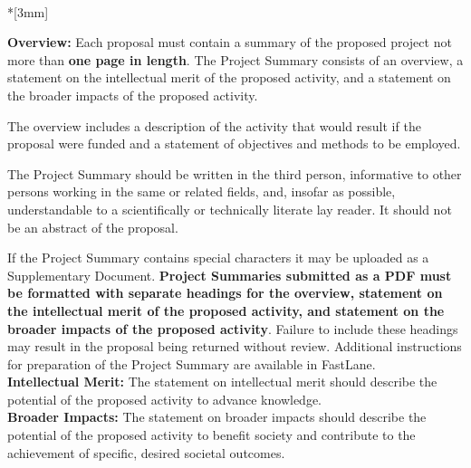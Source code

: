 \documentclass{DOEproposal}
\renewcommand{\title}{\noindent {\Large{\bf Here Goes Your Title!}}}
\begin{document}

{\bf \title} \\*[3mm]

{\bf Overview:} Each proposal must contain a summary of the proposed project not more than {\bf one page in length}. The Project
Summary consists of an overview, a statement on the intellectual merit of the proposed activity, and a statement
on the broader impacts of the proposed activity.

The overview includes a description of the activity that would result if the proposal were funded and a statement
of objectives and methods to be employed.  

The Project Summary should be written in the third person, informative to other persons working in
the same or related fields, and, insofar as possible, understandable to a scientifically or technically 
literate lay reader. It should not be an abstract of the proposal.

If the Project Summary contains special characters it may be uploaded as a Supplementary Document.
{\bf Project Summaries submitted as a PDF must be formatted with separate headings for the overview, statement on the
intellectual merit of the proposed activity, and statement on the broader impacts of the proposed activity}. Failure
to include these headings may result in the proposal being returned without review.
Additional instructions for preparation of the Project Summary are available in FastLane.\\

{\bf Intellectual Merit:} The statement on intellectual merit should describe the potential of
the proposed activity to advance knowledge.\\

{\bf Broader Impacts: } The statement on broader impacts should describe the potential of
the proposed activity to benefit society and contribute to the achievement of specific, 
desired societal outcomes.

\renewcommand{\thepage} {B--\arabic{page}}
\newpage




\end{document}
